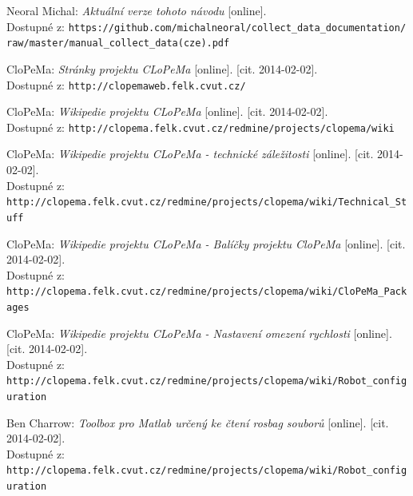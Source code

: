 \documentclass[10pt,a4paper,titlepage,oneside]{report}
\begin{document}
\begin{thebibliography}{00}

 Neoral Michal:
    \emph{Aktuální verze tohoto návodu} [online]. \\
    Dostupné z: \verb|https://github.com/michalneoral/collect_data_documentation/|\\
	\verb|raw/master/manual_collect_data(cze).pdf|

   CloPeMa:
    \emph{Stránky projektu CLoPeMa} [online]. [cit. 2014-02-02].\\
    Dostupné z: \verb|http://clopemaweb.felk.cvut.cz/|

   CloPeMa:
    \emph{Wikipedie projektu CLoPeMa} [online]. [cit. 2014-02-02].\\
    Dostupné z: \verb|http://clopema.felk.cvut.cz/redmine/projects/clopema/wiki|
    
   CloPeMa:
    \emph{Wikipedie projektu CLoPeMa - technické záležitosti} [online]. [cit. 2014-02-02].\\
    Dostupné z: \verb|http://clopema.felk.cvut.cz/redmine/projects/clopema/wiki/Technical_Stuff|
    
   CloPeMa:
    \emph{Wikipedie projektu CLoPeMa - Balíčky projektu CloPeMa} [online]. [cit. 2014-02-02].\\
    Dostupné z: \verb|http://clopema.felk.cvut.cz/redmine/projects/clopema/wiki/CloPeMa_Packages|    

   CloPeMa:
    \emph{Wikipedie projektu CLoPeMa - Nastavení omezení rychlosti} [online]. [cit. 2014-02-02].\\
    Dostupné z: \verb|http://clopema.felk.cvut.cz/redmine/projects/clopema/wiki/Robot_configuration|  

   Ben Charrow:
    \emph{Toolbox pro Matlab určený ke čtení rosbag souborů} [online]. [cit. 2014-02-02].\\
    Dostupné z: \verb|http://clopema.felk.cvut.cz/redmine/projects/clopema/wiki/Robot_configuration|  


\end{thebibliography}
\end{document}
